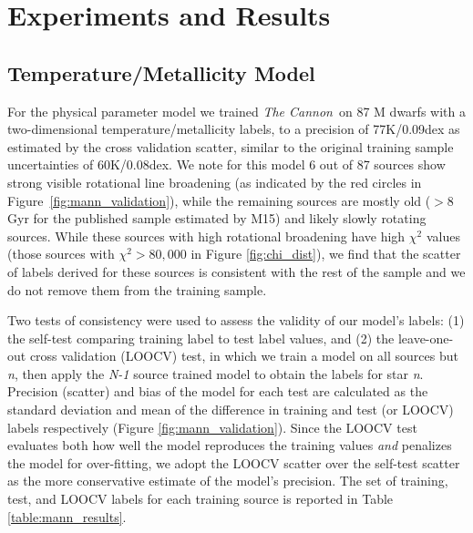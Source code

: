 \documentclass[modern]{aastex62}
\newcommand{\thecannon}{\textsl{The Cannon}}
\begin{document}
\section{Experiments and Results} \label{sec:results}

\subsection{Temperature/Metallicity Model \label{subsec:mann_results}}

For the physical parameter model we trained \thecannon\ on 87 M dwarfs with a two-dimensional temperature/metallicity labels, to a precision of 77K/0.09dex as estimated by the cross validation scatter, similar to the original training sample uncertainties of 60K/0.08dex. We note for this model 6 out of 87 sources show strong visible rotational line broadening (as indicated by the red circles in Figure~\ref{fig:mann_validation}), while the remaining sources are mostly old ($>8$ Gyr for the published sample estimated by M15) and likely slowly rotating sources. While these sources with high rotational broadening have high $\chi^2$ values (those sources with $\chi^2 > 80,000$ in Figure \ref{fig:chi_dist}), we find that the scatter of labels derived for these sources is consistent with the rest of the sample and we do not remove them from the training sample.

Two tests of consistency were used to assess the validity of our model's labels: (1) the self-test comparing training label to test label values, and (2) the leave-one-out cross validation (LOOCV) test, in which we train a model on all sources but \emph{n}, then apply the \emph{N-1} source trained model to obtain the labels for star \emph{n}. Precision (scatter) and bias of the model for each test are calculated as the standard deviation and mean of the difference in training and test (or LOOCV) labels respectively (Figure \ref{fig:mann_validation}). Since the LOOCV test evaluates both how well the model reproduces the training values \emph{and} penalizes the model for over-fitting, we adopt the LOOCV scatter over the self-test scatter as the more conservative estimate of the model's precision. The set of training, test, and LOOCV labels for each training source is reported in Table \ref{table:mann_results}.
\end{document}
